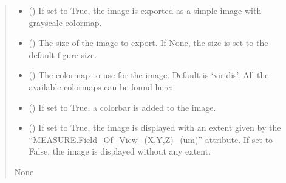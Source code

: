 \documentclass[letterpaper,10pt,english]{sphinxmanual}
\begin{document}
\begin{fulllineitems}
\begin{fulllineitems}
\begin{quote}
\begin{description}
\begin{itemize}
\item {} 
\sphinxAtStartPar
{} (\sphinxstyleliteralemphasis{\sphinxupquote{, }}) \textendash{} If set to True, the image is exported as a simple image with grayscale colormap.

\item {} 
\sphinxAtStartPar
{} (\sphinxstyleliteralemphasis{\sphinxupquote{, }}) \textendash{} The size of the image to export. If None, the size is set to the default figure size.

\item {} 
\sphinxAtStartPar
{} (\sphinxstyleliteralemphasis{\sphinxupquote{, }}) \textendash{} The colormap to use for the image. Default is ‘viridis’. All the available colormaps can be found here: 

\item {} 
\sphinxAtStartPar
{} (\sphinxstyleliteralemphasis{\sphinxupquote{, }}) \textendash{} If set to True, a colorbar is added to the image.

\item {} 
\sphinxAtStartPar
{} (\sphinxstyleliteralemphasis{\sphinxupquote{, }}) \textendash{} If set to True, the image is displayed with an extent given by the “MEASURE.Field\_Of\_View\_(X,Y,Z)\_(um)” attribute. If set to False, the image is displayed without any extent.

\end{itemize}

\sphinxAtStartPar
None

\end{description}\end{quote}

\end{fulllineitems}


\end{fulllineitems}
\end{document}
